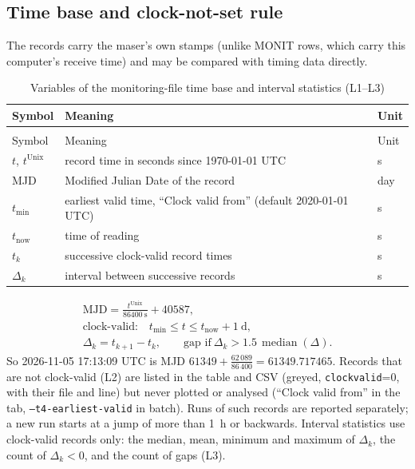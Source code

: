 \documentclass[11pt,a4paper]{article}
\makeatletter
\renewcommand{\_}{\usscore\allowbreak}
\newenvironment{vartable}[2]{%
 \par\small\setlength{\LTpre}{3pt}\setlength{\LTpost}{3pt}%
 \begin{longtable}{@{}>{\raggedright}p{.2\linewidth}>{\raggedright}p{.57\linewidth}>{\raggedright\arraybackslash}p{.17\linewidth}@{}}
 \caption{#2}\label{#1}\\
 \toprule Symbol & Meaning & Unit\\\midrule
 \endfirsthead
 \multicolumn{3}{@{}l}{\footnotesize\itshape Table \thetable{} (continued)}\\
 \toprule Symbol & Meaning & Unit\\\midrule
 \endhead
 \bottomrule
 \endlastfoot}
 {\end{longtable}\normalsize}
\makeatother
\begin{document}
\subsection{Time base and clock-not-set rule}
The records carry the maser's own stamps (unlike MONIT rows, which carry this computer's receive
time) and may be compared with timing data directly.
\begin{vartable}{tab:var-L}{Variables of the monitoring-file time base and interval statistics (L1--L3)}
\(t\), \(t^{\mathrm{Unix}}\) & record time in seconds since 1970-01-01 UTC & s\\
MJD & Modified Julian Date of the record & day\\
\(t_{\mathrm{min}}\) & earliest valid time, ``Clock valid from'' (default 2020-01-01 UTC) & s\\
\(t_{\mathrm{now}}\) & time of reading & s\\
\(t_k\) & successive clock-valid record times & s\\
\(\Delta_k\) & interval between successive records & s\\
\end{vartable}
\begin{gather}
\mathrm{MJD}=\frac{t^{\mathrm{Unix}}}{86400\ \mathrm{s}}+40587, \tag{L1}\label{eq:L1}\\
\text{clock-valid:}\quad t_{\mathrm{min}}\le t\le t_{\mathrm{now}}+1\ \mathrm{d}, \tag{L2}\label{eq:L2}\\
\Delta_k=t_{k+1}-t_k,\qquad \text{gap if}\ \Delta_k>1.5\,\operatorname{median}(\Delta). \tag{L3}\label{eq:L3}
\end{gather}
So 2026-11-05 17:13:09 UTC is MJD $61349+\frac{62\,089}{86\,400}=61349.717465$. Records that are not
clock-valid (L2) are listed in the table and CSV (greyed, \texttt{clock\_valid}=0, with their file and
line) but never plotted or analysed (``Clock valid from'' in the tab, \texttt{--t4-earliest-valid} in
batch). Runs of such records are reported separately; a new run starts at a jump of more than 1~h or
backwards. Interval statistics use clock-valid records only: the median, mean, minimum and maximum of
\(\Delta_k\), the count of \(\Delta_k<0\), and the count of gaps (L3).
\end{document}
